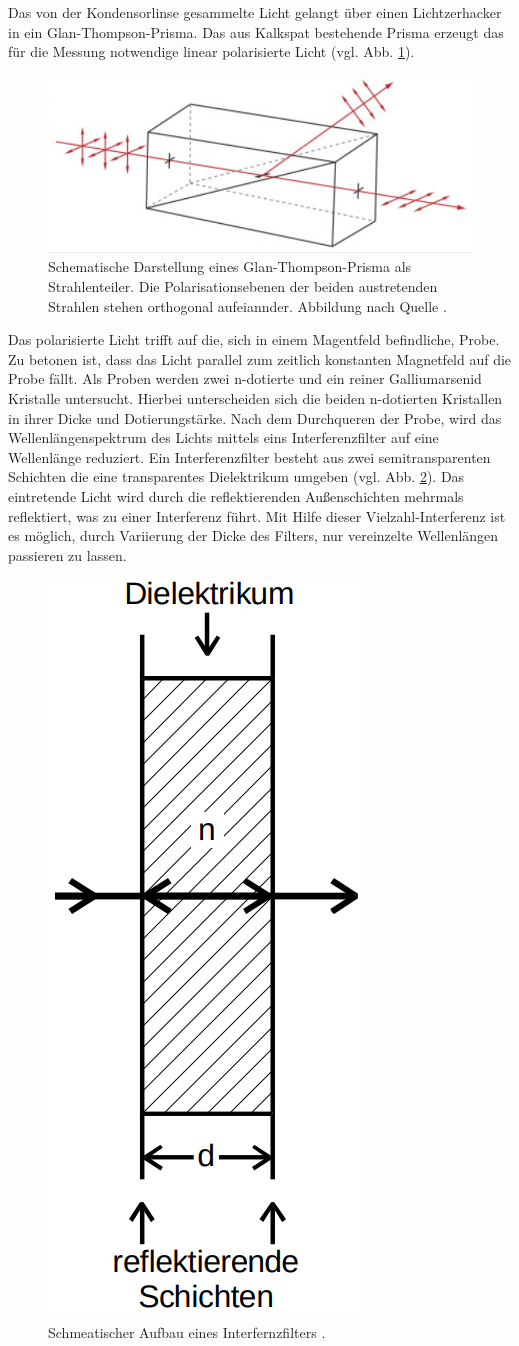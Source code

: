 Das von der Kondensorlinse gesammelte Licht gelangt über einen Lichtzerhacker in
ein Glan-Thompson-Prisma. Das aus Kalkspat bestehende Prisma erzeugt das
für die Messung notwendige linear polarisierte Licht (vgl. Abb. \ref{fig:glan_thompson_prisma}).
\begin{figure}
\centering
\includegraphics[width=0.5\linewidth]{./content/images/glan_thompson_prisma.png}
\caption{Schematische Darstellung eines Glan-Thompson-Prisma als Strahlenteiler.
Die Polarisationsebenen der beiden austretenden Strahlen stehen orthogonal aufeiannder.
Abbildung nach Quelle \cite{glan_thompson_prisma}.}
\label{fig:glan_thompson_prisma}
\end{figure}
Das polarisierte Licht trifft auf die, sich in einem Magentfeld befindliche,
Probe. Zu betonen ist, dass das Licht parallel zum zeitlich konstanten Magnetfeld
auf die Probe fällt. Als Proben werden zwei n-dotierte
und ein reiner Galliumarsenid Kristalle untersucht. Hierbei unterscheiden sich die
beiden n-dotierten Kristallen in ihrer Dicke und Dotierungstärke. Nach dem Durchqueren
der Probe, wird das Wellenlängenspektrum des Lichts mittels
eins Interferenzfilter auf eine Wellenlänge reduziert. Ein Interferenzfilter
besteht aus zwei semitransparenten Schichten die eine transparentes Dielektrikum
umgeben (vgl. Abb. \ref{fig:interferenzfilter}). Das eintretende Licht wird durch die reflektierenden
Außenschichten mehrmals reflektiert, was zu einer Interferenz führt.
Mit Hilfe dieser Vielzahl-Interferenz ist es möglich, durch Variierung der
Dicke des Filters, nur vereinzelte Wellenlängen passieren zu lassen.
\begin{figure}
\centering
\includegraphics[width=0.35\linewidth]{./content/images/interferenzfilter.png}
\caption{Schmeatischer Aufbau eines Interfernzfilters \cite{anleitungv46}.}
\label{fig:interferenzfilter}
\end{figure}
